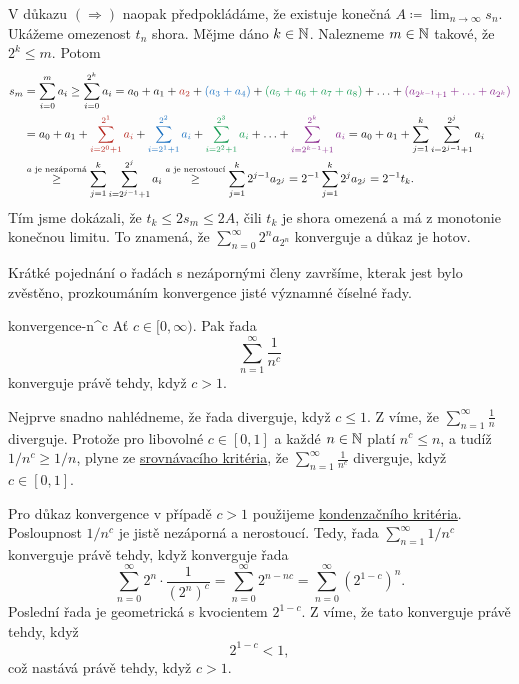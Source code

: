 \begin{thmproof}
 V důkazu $( \Rightarrow )$ naopak předpokládáme, že existuje konečná $A
 \coloneqq \lim_{n \to \infty} s_n$. Ukážeme omezenost $t_n$ shora. Mějme dáno
 $k \in \mathbb{N}$. Nalezneme $m \in \mathbb{N}$ takové, že $2^{k} \leq m$. Potom
 \begin{align*}
  s_m &= \sum_{i=0}^{m} a_i \geq \sum_{i=0}^{2^{k}} a_i = a_0 + a_1 + \clr{a_2}
  + \clb{(a_3 + a_4)} + \clg{(a_5 + a_6 + a_7 + a_8)} + \ldots +
  \clm{(a_{2^{k-1}+1}+\ldots+a_{2^{k}})}\\
      &= a_0 + a_1 + \clr{\sum_{i=2^{0}+1}^{2^1} a_i} +
      \clb{\sum_{i=2^1+1}^{2^2} a_i} + \clg{\sum_{i=2^2+1}^{2^3} a_i} + \ldots +
      \clm{\sum_{i=2^{k-1}+1}^{2^{k}} a_i} = a_0 + a_1 + \sum_{j=1}^{k}
      \sum_{i=2^{j-1}+1}^{2^{j}} a_i\\
      & \overset{\text{$a$ je nezáporná}}{ \geq } \sum_{j=1}^k
      \sum_{i=2^{j-1}+1}^{2^{j}} a_i \overset{\text{$a$ je nerostoucí}}{ \geq }
      \sum_{j=1}^k 2^{j-1}a_{2^{j}} = 2^{-1} \sum_{j=1}^k 2^{j}a_{2^{j}} =
      2^{-1}t_k.
 \end{align*}
 Tím jsme dokázali, že $t_k \leq 2s_m \leq 2A$, čili $t_k$ je shora omezená a
 má z monotonie konečnou limitu. To znamená, že $\sum_{n=0}^{\infty}
 2^{n}a_{2^{n}}$ konverguje a důkaz je hotov.
\end{thmproof}

Krátké pojednání o řadách s nezápornými členy završíme, kterak jest bylo
zvěstěno, prozkoumáním konvergence jisté významné číselné řady.

\begin{proposition}{}{konvergence-n^c}
 Ať $c \in [0,\infty)$. Pak řada
 \[
  \sum_{n = 1}^{\infty} \frac{1}{n^{c}}
 \]
 konverguje právě tehdy, když $c > 1$.
\end{proposition}
\begin{propproof}
 Nejprve snadno nahlédneme, že řada diverguje, když $c \leq 1$. Z
  víme, že $\sum_{n = 1}^{\infty}
 \frac{1}{n}$ diverguje. Protože pro libovolné $c \in [0,1]$ a každé $n \in \mathbb{N}$
 platí $n^{c} \leq n$, a tudíž $1 / n^{c} \geq 1 / n$, plyne ze
 \hyperref[prop:srovnavaci-kriterium]{srovnávacího kritéria}, že
 $\sum_{n=1}^{\infty} \frac{1}{n^{c}}$ diverguje, když $c \in [0,1]$.

 Pro důkaz konvergence v případě $c > 1$ použijeme
 \hyperref[thm:kondenzacni-kriterium]{kondenzačního kritéria}. Posloupnost $1 /
 n^{c}$ je jistě nezáporná a nerostoucí. Tedy, řada $\sum_{n=1}^{\infty} 1 /
 n^{c}$ konverguje právě tehdy, když konverguje řada
 \[
  \sum_{n=0}^{\infty} 2^{n} \cdot \frac{1}{(2^{n})^{c}} = \sum_{n = 0}^{\infty}
  2^{n-nc} = \sum_{n=0}^{\infty} (2^{1-c})^{n}.
 \]
 Poslední řada je geometrická s kvocientem $2^{1-c}$. Z
  víme, že tato konverguje právě tehdy, když
 \[
  2^{1-c} < 1,
 \]
 což nastává právě tehdy, když $c > 1$.
\end{propproof}

